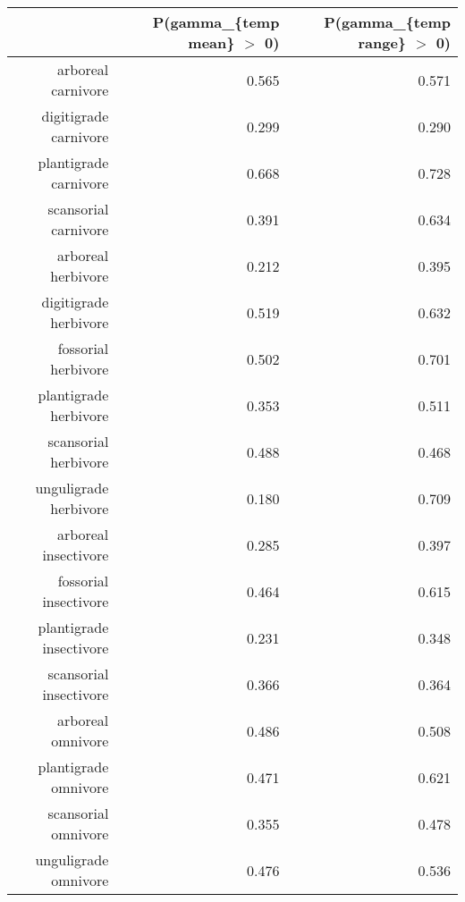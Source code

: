 \begin{table}[ht]
\centering
\begin{tabular}{rrr}
  \hline
 & P(gamma\_\{temp mean\} $>$ 0) & P(gamma\_\{temp range\} $>$ 0) \\ 
  \hline
arboreal carnivore & 0.565 & 0.571 \\ 
  digitigrade carnivore & 0.299 & 0.290 \\ 
  plantigrade carnivore & 0.668 & 0.728 \\ 
  scansorial carnivore & 0.391 & 0.634 \\ 
  arboreal herbivore & 0.212 & 0.395 \\ 
  digitigrade herbivore & 0.519 & 0.632 \\ 
  fossorial herbivore & 0.502 & 0.701 \\ 
  plantigrade herbivore & 0.353 & 0.511 \\ 
  scansorial herbivore & 0.488 & 0.468 \\ 
  unguligrade herbivore & 0.180 & 0.709 \\ 
  arboreal insectivore & 0.285 & 0.397 \\ 
  fossorial insectivore & 0.464 & 0.615 \\ 
  plantigrade insectivore & 0.231 & 0.348 \\ 
  scansorial insectivore & 0.366 & 0.364 \\ 
  arboreal omnivore & 0.486 & 0.508 \\ 
  plantigrade omnivore & 0.471 & 0.621 \\ 
  scansorial omnivore & 0.355 & 0.478 \\ 
  unguligrade omnivore & 0.476 & 0.536 \\ 
   \hline
\end{tabular}
\label{tab:surv_temp}
\end{table}
